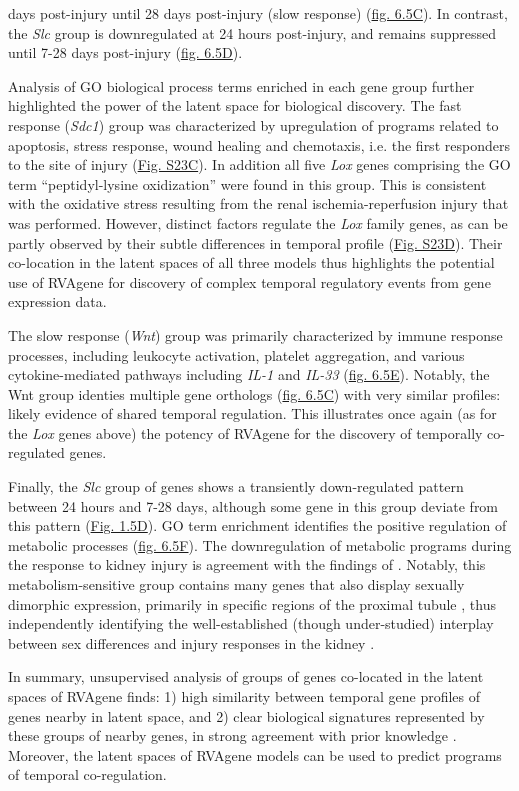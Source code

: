 days post-injury until 28 days post-injury (slow response) (\hyperref[fig:fig6b]{fig. 6.5C}). In
contrast, the {\em Slc} group is downregulated at 24 hours post-injury, and remains suppressed until
7-28 days post-injury (\hyperref[fig:fig6b]{fig. 6.5D}).
\par 
Analysis of GO biological process terms enriched in each gene group further highlighted the power of the latent space for biological discovery. The fast response ({\em Sdc1}) group was characterized by upregulation of programs related to apoptosis, stress response, wound healing and chemotaxis, i.e. the first responders to the site of injury (\hyperref[fig:figS8]{Fig. S23C}). In addition all five {\em Lox} genes comprising the GO term ``peptidyl-lysine oxidization'' were found in this group. This is consistent with the oxidative stress resulting from the renal ischemia-reperfusion injury that was performed. However, distinct factors regulate the {\em Lox} family genes, as can be partly observed by their subtle differences in temporal profile (\hyperref[fig:figS8]{Fig. S23D}). Their co-location in the latent spaces of all three models thus highlights the potential use of RVAgene for discovery of complex temporal regulatory events from gene expression data.
\par
The slow response ({\em Wnt}) group was primarily characterized by immune response processes,
including leukocyte activation, platelet aggregation, and various cytokine-mediated pathways
including {\em IL-1} and {\em IL-33} (\hyperref[fig:fig6b]{fig. 6.5E}). Notably, the Wnt group
identies multiple gene orthologs (\hyperref[fig:fig6b]{fig. 6.5C}) with very similar profiles: likely evidence of shared temporal regulation. This illustrates once again (as for the {\em Lox} genes above) the potency of RVAgene for the discovery of temporally co-regulated genes.
\par
Finally, the {\em Slc} group of genes shows a transiently down-regulated pattern between 24 hours
and 7-28 days, although some gene in this group deviate from this pattern (\hyperref[fig:fig6b]{Fig.
1.5D}). 
GO term enrichment identifies the positive regulation of metabolic processes
(\hyperref[fig:fig6b]{fig. 6.5F}). The downregulation of metabolic programs during the response to kidney injury is agreement with the findings of \citet{liu2017molecular}. Notably, this metabolism-sensitive group contains many genes that also display sexually dimorphic expression, primarily in specific regions of the proximal tubule \citep{ransick19_singlecell}, thus independently identifying the well-established (though under-studied) interplay between sex differences and injury responses in the kidney \citep{neugarten00_effect}. 
\par 
In summary, unsupervised analysis of groups of genes co-located in the latent spaces of RVAgene finds: 1) high similarity between temporal gene profiles of genes nearby in latent space, and 2) clear biological signatures represented by these groups of nearby genes, in strong agreement with prior knowledge \citep{liu2017molecular}. Moreover, the latent spaces of RVAgene models can be used to predict programs of temporal co-regulation. 
\par


